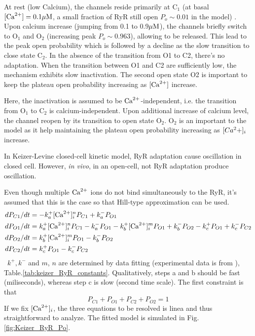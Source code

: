 At rest (low Calcium), the channels reside primarily at C$_1$ (at basal $[{\text{Ca}^{2+}}] =
0.1{\mu\text{M}}$, a small fraction of RyR still open $P_o \sim 0.01$ in the model) .
Upon calcium increase (jumping from 0.1 to 0.9${\mu\text{M}}$), the channels briefly
switch to O$_1$ and O$_2$ (increasing peak $P_o \sim 0.963$), allowing
 to be released.
This lead to the peak open probability which is followed by a decline as the
slow transition to close state C$_2$.
In the absence of the transition from O1 to C2, there's no adaptation. When the
transition between O1 and C2 are sufficiently low, the mechanism exhibits slow
inactivation. The second open state O2 is important to keep the plateau open
probability increasing as $[{\text{Ca}^{2+}}]$ increase.

Here, the inactivation is assumed to be ${\text{Ca}^{2+}}$-independent, i.e.
the transition from O$_1$ to C$_2$ is calcium-independent.
Upon additional increase of calcium level, the channel reopen by its transition
to open state O$_2$. O$_2$ is an important to the model as it help maintaining
the plateau open probability increasing as $\ce[Ca^2+]_i$ increase.

\begin{framed}
  In Keizer-Levine closed-cell kinetic model, RyR adaptation cause
   oscillation in closed cell. However, {\it in vivo}, in an
  open-cell, not RyR adaptation produce  oscillation.
\end{framed}

Even though multiple ${\text{Ca}^{2+}}$ ions do not bind simultaneously to the RyR, it's
assumed that this is the case so that Hill-type approximation can be used.
\begin{equation}
\begin{split}
dP_{C1}/dt &= - k^+_a[{\text{Ca}^{2+}}]^n_i P_{C1} +  k^-_a P_{O1} \\
dP_{O1}/dt &= k^+_a[{\text{Ca}^{2+}}]^n_i P_{C1} - k^-_a P_{O1} - k^+_b [{\text{Ca}^{2+}}]_i^m P_{O1} +
k^-_b P_{O2} - k^+_c P_{O1} + k^-_c P_{C2} \\
dP_{O2}/dt &= k^+_b [{\text{Ca}^{2+}}]_i^m P_{O1} - k^-_b P_{O2} \\
dP_{C2}/dt &= k^+_c P_{O1} - k^-_c P_{C2}
\end{split}
\end{equation}\
$k^+, k^-$ and $m$, $n$	are determined by data fitting (experimental data is
from \citep{gyorke1993ryr}), Table.\ref{tab:keizer_RyR_constants}.
Qualitatively, steps a and b should be fast (miliseconds), whereas step c is slow (second time scale).
The first constraint is that
\begin{equation}
P_{C1}+P_{O1}+P_{C2}+P_{O2} = 1
\end{equation}
If we fix $[{\text{Ca}^{2+}}]_i$, the three equations to be resolved is linea and thus
straightforward to analyze. The fitted model is simulated in
Fig.\ref{fig:Keizer_RyR_Po}.

